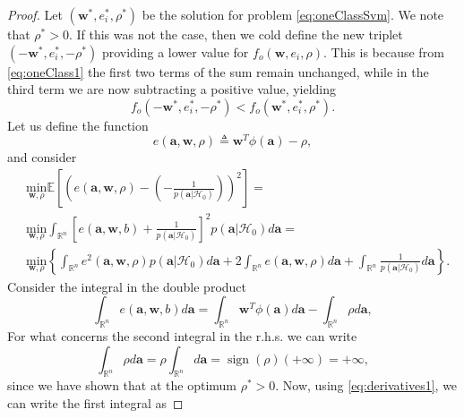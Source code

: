 \documentclass[draftcls,onecolumn,12pt]{IEEEtran}
\newcommand{\Exp}[1]{\mathbb{E}\left[#1\right]}
\DeclareMathOperator{\sign}{sign}
\begin{document}
\begin{proof}
Let $(\mathbf{w}^*,e_i^*, \rho^*)$ be the solution for problem \eqref{eq:oneClassSvm}. We note that $\rho^* >0$. If this was not the case, then we cold define the new triplet $(-\mathbf{w}^*,e_i^*, -\rho^*)$ providing a lower value for $f_o(\mathbf{w},e_i,\rho)$. This is because from \eqref{eq:oneClass1} the first two terms of the sum remain unchanged, while in the third term we are now subtracting a positive value, yielding
\begin{equation}
		f_o(-\mathbf{w}^*,e_i^*, -\rho^*) < f_o(\mathbf{w}^*,e_i^*, \rho^*).
\end{equation} 
Let us define the function 
\begin{equation}
	e(\mathbf{a},\mathbf{w},\rho) \triangleq \mathbf{w}^T  \phi (\mathbf{a}) - \rho,	
\end{equation}
and consider 
\begin{equation}
\label{eq:coreTheorem}
	\begin{aligned}
		&\underset{\mathbf{w},\rho}{\text{min}} \Exp{ \left( e(\mathbf{a},\mathbf{w},\rho) - \left(-\frac{1}{p(\mathbf{a}|\mathcal{H}_0)}\right)\right) ^2} = \\
		&\underset{\mathbf{w},\rho}{\text{min}} \int_{\mathbb{R}^n} \left[ e(\mathbf{a},\mathbf{w},b) + \frac{1}{p(\mathbf{a}|\mathcal{H}_0)} \right] ^2 p(\mathbf{a}|\mathcal{H}_0) d\mathbf{a} = \\
		&\underset{\mathbf{w},\rho}{\text{min}} \left\lbrace \int_{\mathbb{R}^n} e^2(\mathbf{a},\mathbf{w},\rho) p(\mathbf{a}|\mathcal{H}_0) d\mathbf{a}
		+2\int_{\mathbb{R}^n} e(\mathbf{a},\mathbf{w},\rho) d\mathbf{a}
		+ \int_{\mathbb{R}^n} \frac{1}{p(\mathbf{a}|\mathcal{H}_0)} d\mathbf{a} \right\rbrace.
	\end{aligned}	
\end{equation}
Consider the integral in the double product
\begin{equation}
		\int_{\mathbb{R}^n} e(\mathbf{a},\mathbf{w},b) d\mathbf{a} =
		\int_{\mathbb{R}^n} \mathbf{w} ^T  \phi (\mathbf{a})d\mathbf{a} - \int_{\mathbb{R}^n} \rho d\mathbf{a},		
\end{equation}
For what concerns the second integral in the r.h.s. we can write
\begin{equation}
		\int_{\mathbb{R}^n} \rho d\mathbf{a} = \rho \int_{\mathbb{R}^n} d\mathbf{a} = \sign(\rho) (+\infty) = + \infty,
\end{equation}
since we have shown that at the optimum $\rho^*>0$. Now, using \eqref{eq:derivatives1}, we can write the first integral as

\end{proof}
\end{document}
